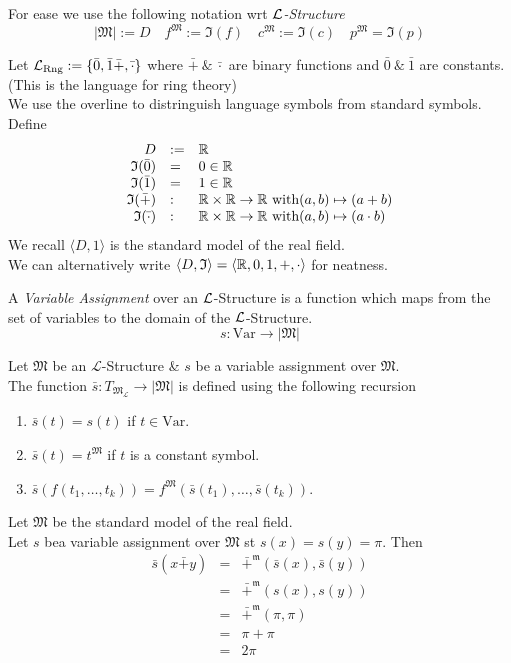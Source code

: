 \documentclass[11pt,a4paper]{article}
\begin{document}
For ease we use the following notation wrt \textit{$\mathcal{L}$-Structure}
$$|\mathfrak{M}|:=D\quad f^\mathfrak{M}:=\mathfrak{I}(f)\quad c^\mathfrak{M}:=\mathfrak{I}(c)\quad p^\mathfrak{M}=\mathfrak{I}(p)$$

Let $\mathcal{L}_\text{Rng}:=\{\bar0,\bar1\bar+,\bar\cdot\}$ where $\bar+\ \&\ \bar\cdot$ are binary functions and $\bar0\ \&\ \bar1$ are constants.\\
(This is the language for ring theory)\\
We use the overline to distringuish language symbols from standard symbols.\\
Define
\[\begin{array}{rll}
D&:=&\mathbb{R}\\
\mathfrak{I}(\bar0)&=&0\in\mathbb{R}\\
\mathfrak{I}(\bar1)&=&1\in\mathbb{R}\\
\mathfrak{I}(\bar+)&:&\mathbb{R}\times\mathbb{R}\to\mathbb{R}\text{ with} (a,b)\mapsto(a+b)\\
\mathfrak{I}(\bar\cdot)&:&\mathbb{R}\times\mathbb{R}\to\mathbb{R}\text{ with} (a,b)\mapsto(a\cdot b)
\end{array}\]
We recall $\langle D,\mathfrak{1}\rangle$ is the standard model of the real field.\\
\nb We can alternatively write $\langle D,\mathfrak{I}\rangle=\langle\mathbb{R},0,1,+,\cdot\rangle$ for neatness.

A \textit{Variable Assignment} over an $\mathcal{L}$-Structure is a function which maps from the set of variables to the domain of the $\mathcal{L}$-Structure.
$$s:\text{Var}\to|\mathfrak{M}|$$

Let $\mathfrak{M}$ be an $\mathcal{L}$-Structure \& $s$ be a variable assignment over $\mathfrak{M}$.\\
The function $\bar{s}:T_{\mathfrak{M}_\mathcal{L}}\to|\mathfrak{M}|$ is defined using the following recursion
\begin{enumerate}
	\item $\bar{s}(t)=s(t)$ if $t\in\text{Var}$.
	\item $\bar{s}(t)=t^\mathfrak{M}$ if $t$ is a constant symbol.
	\item $\bar{s}(f(t_1,\dots,t_k))=f^\mathfrak{M}(\bar{s}(t_1),\dots,\bar{s}(t_k))$.
\end{enumerate}

Let $\mathfrak{M}$ be the standard model of the real field.\\
Let $s$ bea variable assignment over $\mathfrak{M}$ st $s(x)=s(y)=\pi$. Then
\[\begin{array}{rcl}
\bar{s}(x\bar+y)&=&\bar+^\mathfrak{m}(\bar{s}(x),\bar{s}(y))\\
&=&\bar+^\mathfrak{m}(s(x),s(y))\\
&=&\bar+^\mathfrak{m}(\pi,\pi)\\
&=&\pi+\pi\\
&=&2\pi
\end{array}\]
\end{document}
